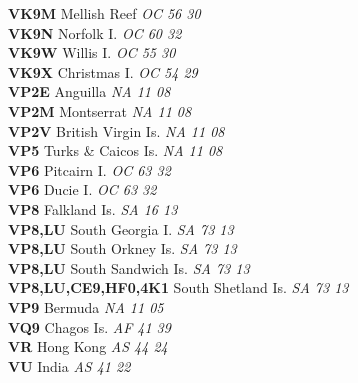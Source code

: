 ﻿\documentclass[landscape,a4paper]{article}
\begin{document}
\begin{multicols}{6}
\textbf{VK9M                    } Mellish Reef                       \emph{ OC     56     30    } \\
\textbf{VK9N                    } Norfolk I.                         \emph{ OC     60     32    } \\
\textbf{VK9W                    } Willis I.                          \emph{ OC     55     30    } \\
\textbf{VK9X                    } Christmas I.                       \emph{ OC     54     29    } \\
\textbf{VP2E                    } Anguilla                           \emph{ NA     11     08    } \\
\textbf{VP2M                    } Montserrat                         \emph{ NA     11     08    } \\
\textbf{VP2V                    } British Virgin Is.                 \emph{ NA     11     08    } \\
\textbf{VP5                     } Turks \& Caicos Is.                \emph{ NA     11     08    } \\
\textbf{VP6                     } Pitcairn I.                        \emph{ OC     63     32    } \\
\textbf{VP6                     } Ducie I.                           \emph{ OC     63     32    } \\
\textbf{VP8                     } Falkland Is.                       \emph{ SA     16     13    } \\
\textbf{VP8,LU                  } South Georgia I.                   \emph{ SA     73     13    } \\
\textbf{VP8,LU                  } South Orkney Is.                   \emph{ SA     73     13    } \\
\textbf{VP8,LU                  } South Sandwich Is.                 \emph{ SA     73     13    } \\
\textbf{VP8,LU,CE9,HF0,4K1      } South Shetland Is.                 \emph{ SA     73     13    } \\
\textbf{VP9                     } Bermuda                            \emph{ NA     11     05    } \\
\textbf{VQ9                     } Chagos Is.                         \emph{ AF     41     39    } \\
\textbf{VR                      } Hong Kong                          \emph{ AS     44     24    } \\
\textbf{VU                      } India                              \emph{ AS     41     22    } \\

\end{multicols}
\end{document}

